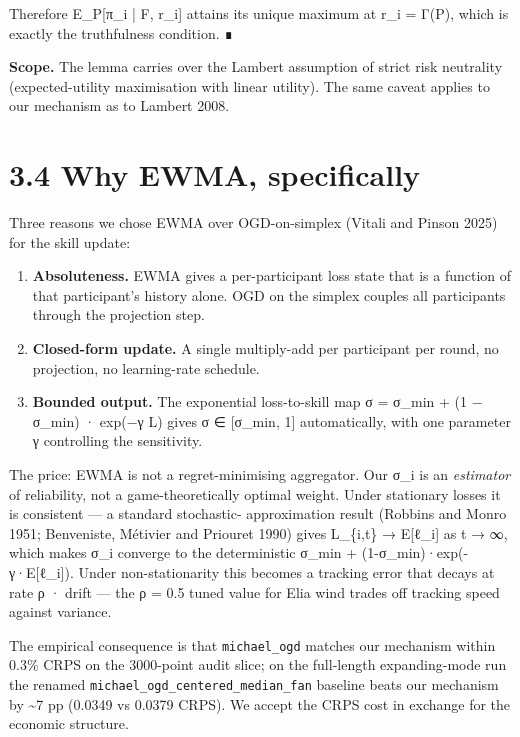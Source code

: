 \documentclass[11pt,a4paper,openany]{report}
\begin{document}
Therefore E\_P[π\_i | F, r\_i] attains its unique maximum at r\_i = Γ(P),
which is exactly the truthfulness condition. ∎

\textbf{Scope.} The lemma carries over the Lambert assumption of strict
risk neutrality (expected-utility maximisation with linear utility).
The same caveat applies to our mechanism as to Lambert 2008.

\section{3.4 Why EWMA, specifically}

Three reasons we chose EWMA over OGD-on-simplex (Vitali and Pinson 2025)
for the skill update:

\begin{enumerate}
  \item \textbf{Absoluteness.} EWMA gives a per-participant loss state that is a
    function of that participant's history alone. OGD on the simplex
    couples all participants through the projection step.
  \item \textbf{Closed-form update.} A single multiply-add per participant per
    round, no projection, no learning-rate schedule.
  \item \textbf{Bounded output.} The exponential loss-to-skill map σ = σ\_min +
    (1 − σ\_min) · exp(−γ L) gives σ ∈ [σ\_min, 1] automatically, with
    one parameter γ controlling the sensitivity.
\end{enumerate}

The price: EWMA is not a regret-minimising aggregator. Our σ\_i is an
\emph{estimator} of reliability, not a game-theoretically optimal weight.
Under stationary losses it is consistent — a standard stochastic-
approximation result (Robbins and Monro 1951; Benveniste, Métivier and
Priouret 1990) gives L\_\{i,t\} → E[ℓ\_i] as t → ∞, which makes σ\_i
converge to the deterministic σ\_min + (1-σ\_min)·exp(-γ·E[ℓ\_i]). Under
non-stationarity this becomes a tracking error that decays at rate
ρ · drift — the ρ = 0.5 tuned value for Elia wind trades off tracking
speed against variance.

The empirical consequence is that \texttt{michael\_ogd} matches our mechanism
within 0.3\% CRPS on the 3000-point audit slice; on the full-length
expanding-mode run the renamed \texttt{michael\_ogd\_centered\_median\_fan}
baseline beats our mechanism by \textasciitilde{}7 pp (0.0349 vs 0.0379 CRPS). We
accept the CRPS cost in exchange for the economic structure.
\end{document}
